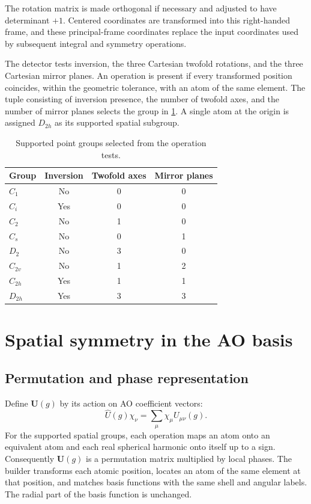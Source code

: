 \documentclass[aip,jcp,preprint,nobibnotes,nofootinbib]{revtex4-1}
\newcommand{\bvec}[1]{\mathbf{#1}}
\begin{document}
The rotation matrix is made orthogonal if necessary and adjusted to have
determinant $+1$. Centered coordinates are transformed into this right-handed
frame, and these principal-frame coordinates replace the input coordinates
used by subsequent integral and symmetry operations.

The detector tests inversion, the three Cartesian twofold rotations, and the
three Cartesian mirror planes. An operation is present if every transformed
position coincides, within the geometric tolerance, with an atom of the same
element. The tuple consisting of inversion presence, the number of twofold
axes, and the number of mirror planes selects the group in
\cref{tab:group-detection}. A single atom at the origin is assigned $D_{2h}$
as its supported spatial subgroup.

\begin{table}[ht]
\setlength{\tabcolsep}{10pt}
\caption{Supported point groups selected from the operation tests.}
\label{tab:group-detection}
\begin{tabular}{@{}lccc@{}}
\hline
Group & Inversion & Twofold axes & Mirror planes \\
\hline
$C_1$ & No & 0 & 0 \\
$C_i$ & Yes & 0 & 0 \\
$C_2$ & No & 1 & 0 \\
$C_s$ & No & 0 & 1 \\
$D_2$ & No & 3 & 0 \\
$C_{2v}$ & No & 1 & 2 \\
$C_{2h}$ & Yes & 1 & 1 \\
$D_{2h}$ & Yes & 3 & 3 \\
\hline
\end{tabular}
\end{table}

\section{Spatial symmetry in the AO basis}
\label{sec:ao}

\subsection{Permutation and phase representation}

Define $\bvec{U}(g)$ by its action on AO coefficient vectors:
\begin{equation}
 \hat U(g)\chi_\nu=\sum_\mu\chi_\mu U_{\mu\nu}(g).
 \label{eq:ao-action}
\end{equation}
For the supported spatial groups, each operation maps an atom onto an
equivalent atom and each real spherical harmonic onto itself up to a sign.
Consequently $\bvec{U}(g)$ is a permutation matrix multiplied by local phases.
The builder transforms each atomic position, locates an atom of the same
element at that position, and matches basis functions with the same shell and
angular labels. The radial part of the basis function is unchanged.
\end{document}
